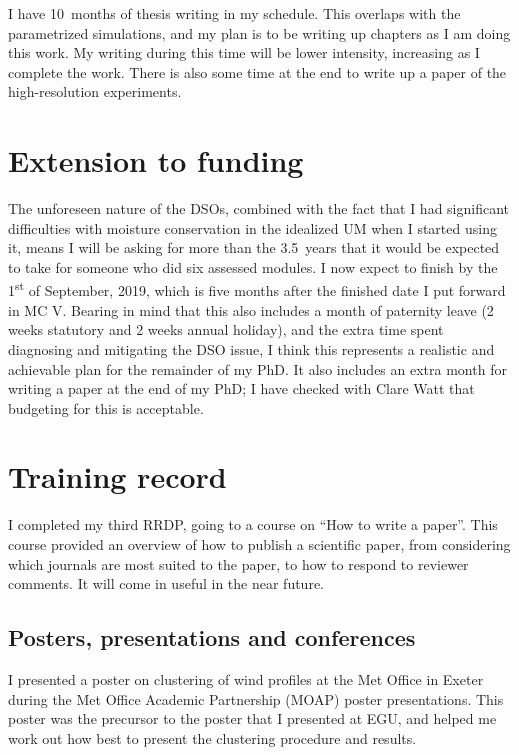 \documentclass[11pt,a4paper]{article}
\newcommand{\ts}{\textsuperscript}
\begin{document}
I have \SI{10}{months} of thesis writing in my schedule. This overlaps with the parametrized simulations, and my plan is to be writing up chapters as I am doing this work. My writing during this time will be lower intensity, increasing as I complete the work. There is also some time at the end to write up a paper of the high-resolution experiments. 

\section{Extension to funding}
\label{sec:extension}

The unforeseen nature of the DSOs, combined with the fact that I had significant difficulties with moisture conservation in the idealized UM when I started using it, means I will be asking for more than the \SI{3.5}{years} that it would be expected to take for someone who did six assessed modules. 
I now expect to finish by the 1\ts{st} of September, 2019, which is five months after the finished date I put forward in MC V. Bearing in mind that this also includes a month of paternity leave (2 weeks statutory and 2 weeks annual holiday), and the extra time spent diagnosing and mitigating the DSO issue, I think this represents a realistic and achievable plan for the remainder of my PhD. It also includes an extra month for writing a paper at the end of my PhD; I have checked with Clare Watt that budgeting for this is acceptable.

\section{Training record}
\label{sec:Training record}

I completed my third RRDP, going to a course on ``How to write a paper''. This course provided an overview of how to publish a scientific paper, from considering which journals are most suited to the paper, to how to respond to reviewer comments. It will come in useful in the near future.

\subsection{Posters, presentations and conferences}
\label{sec:presentations}

I presented a poster on clustering of wind profiles at the Met Office in Exeter during the Met Office Academic Partnership (MOAP) poster presentations. This poster was the precursor to the poster that I presented at EGU, and helped me work out how best to present the clustering procedure and results.
\end{document}

